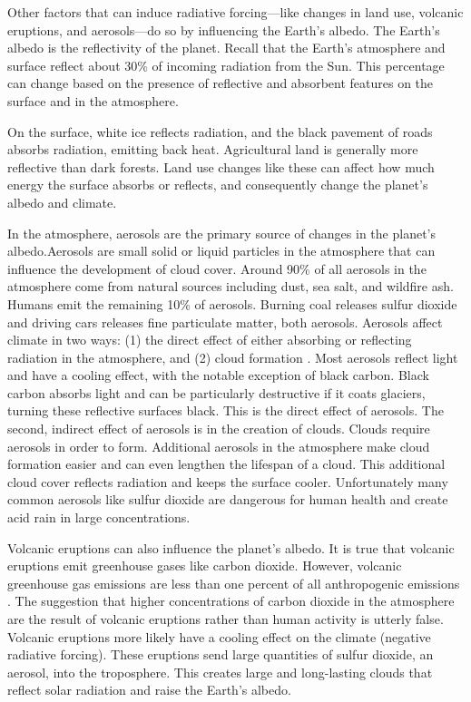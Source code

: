 Other factors that can induce radiative forcing---like changes in land use, volcanic eruptions, and aerosols---do so by influencing the Earth's albedo. The Earth's albedo is the reflectivity of the planet. Recall that the Earth's atmosphere and surface reflect about 30\% of incoming radiation from the Sun. This percentage can change based on the presence of reflective and absorbent features on the surface and in the atmosphere. 

On the surface, white ice reflects radiation, and the black pavement of roads absorbs radiation, emitting back heat. Agricultural land is generally more reflective than dark forests. Land use changes like these can affect how much energy the surface absorbs or reflects, and consequently change the planet's albedo and climate. 

In the atmosphere, aerosols are the primary source of changes in the planet's albedo.Aerosols are small solid or liquid particles in the atmosphere that can influence the development of cloud cover. Around 90\% of all aerosols in the atmosphere come from natural sources including dust, sea salt, and  wildfire ash. Humans emit the remaining 10\% of aerosols. Burning coal releases sulfur dioxide and driving cars releases fine particulate matter, both aerosols. Aerosols affect climate in two ways: (1) the direct effect of either absorbing or reflecting radiation in the atmosphere, and (2) cloud formation \citep{gfdl}. Most aerosols reflect light and have a cooling effect, with the notable exception of black carbon. Black carbon absorbs light and can be particularly destructive if it coats glaciers, turning these reflective surfaces black. This is the direct effect of aerosols. The second, indirect effect of aerosols is in the creation of clouds. Clouds require aerosols in order to form. Additional aerosols in the atmosphere make cloud formation easier and can even lengthen the lifespan of a cloud. This additional cloud cover reflects radiation and keeps the surface cooler. Unfortunately many common aerosols like sulfur dioxide are dangerous for human health and create acid rain in large concentrations. 

Volcanic eruptions can also influence the planet's albedo. It is true that volcanic eruptions emit greenhouse gases like carbon dioxide. However, volcanic greenhouse gas emissions are less than one percent of all anthropogenic emissions \citep{usgs, gerlach2011volcanic}. The suggestion that higher concentrations of carbon dioxide in the atmosphere are the result of volcanic eruptions rather than human activity is utterly false. Volcanic eruptions more likely have a cooling effect on the climate (negative radiative forcing). These eruptions send large quantities of sulfur dioxide, an aerosol, into the troposphere. This creates large and long-lasting clouds that reflect solar radiation and raise the Earth's albedo. 

